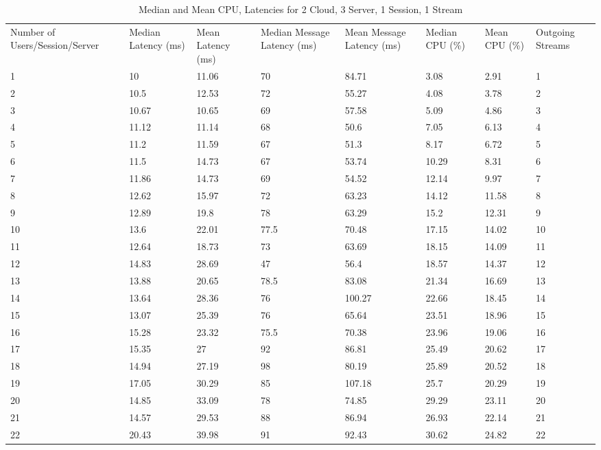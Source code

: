 \begin{table}
\caption{Median and Mean CPU, Latencies for 2 Cloud, 3 Server, 1 Session, 1 Stream}
\label{table:2cld_3serv_1sess_1str}
\begin{tabu} to\linewidth{|X[c]|X[c]|X[c]|X[c]|X[c]|X[c]|X[c]|X[c]|}
\everyrow{\hline}
\hline
Number of Users/Session/Server & Median Latency (ms) & Mean Latency (ms) & Median Message Latency (ms) & Mean Message Latency (ms) & Median CPU (\%) & Mean CPU (\%) & Outgoing Streams\\
1 & 10 & 11.06 & 70 & 84.71 & 3.08 & 2.91 & 1 \\
2 & 10.5 & 12.53 & 72 & 55.27 & 4.08 & 3.78 & 2 \\
3 & 10.67 & 10.65 & 69 & 57.58 & 5.09 & 4.86 & 3 \\
4 & 11.12 & 11.14 & 68 & 50.6 & 7.05 & 6.13 & 4 \\
5 & 11.2 & 11.59 & 67 & 51.3 & 8.17 & 6.72 & 5 \\
6 & 11.5 & 14.73 & 67 & 53.74 & 10.29 & 8.31 & 6 \\
7 & 11.86 & 14.73 & 69 & 54.52 & 12.14 & 9.97 & 7 \\
8 & 12.62 & 15.97 & 72 & 63.23 & 14.12 & 11.58 & 8 \\
9 & 12.89 & 19.8 & 78 & 63.29 & 15.2 & 12.31 & 9 \\
10 & 13.6 & 22.01 & 77.5 & 70.48 & 17.15 & 14.02 & 10 \\
11 & 12.64 & 18.73 & 73 & 63.69 & 18.15 & 14.09 & 11 \\
12 & 14.83 & 28.69 & 47 & 56.4 & 18.57 & 14.37 & 12 \\
13 & 13.88 & 20.65 & 78.5 & 83.08 & 21.34 & 16.69 & 13 \\
14 & 13.64 & 28.36 & 76 & 100.27 & 22.66 & 18.45 & 14 \\
15 & 13.07 & 25.39 & 76 & 65.64 & 23.51 & 18.96 & 15 \\
16 & 15.28 & 23.32 & 75.5 & 70.38 & 23.96 & 19.06 & 16 \\
17 & 15.35 & 27 & 92 & 86.81 & 25.49 & 20.62 & 17 \\
18 & 14.94 & 27.19 & 98 & 80.19 & 25.89 & 20.52 & 18 \\
19 & 17.05 & 30.29 & 85 & 107.18 & 25.7 & 20.29 & 19 \\
20 & 14.85 & 33.09 & 78 & 74.85 & 29.29 & 23.11 & 20 \\
21 & 14.57 & 29.53 & 88 & 86.94 & 26.93 & 22.14 & 21 \\
22 & 20.43 & 39.98 & 91 & 92.43 & 30.62 & 24.82 & 22 \\

\end{tabu}
\end{table}

